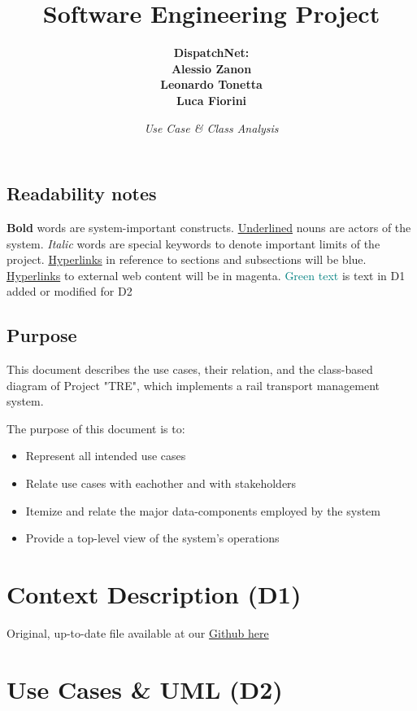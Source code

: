 \documentclass[12pt]{report}
\title{\bf{Software Engineering Project}}
\author{\bf{DispatchNet:} \\ Alessio Zanon \\ Leonardo Tonetta \\ Luca Fiorini}
\date{\it{Use Case \& Class Analysis}}
\renewcommand\bf[1]{\textbf{#1}}
\renewcommand\it[1]{\textit{#1}}
\newcommand\un[1]{\underline{#1}}
\newcommand\gitter[1]{
	\href{https://github.com/DispatchNet/TRE/blob/main/#1}{Github here}
}
\begin{document}
\maketitle

\newpage
\tableofcontents \label{Contents}

\section*{Readability notes}
\bf{Bold} words are system-important constructs. \newline
\un{Underlined} nouns are actors of the system. \newline
\it{Italic} words are special keywords to denote important limits of the project. \newline
\hyperref[Contents]{Hyperlinks} in reference to sections and subsections will be blue. \newline
\href{https:\\www.google.com}{Hyperlinks} to external web content will be in magenta. \newline
\textcolor{teal}{Green text} is text in D1 added or modified for D2

\newpage

\section*{Purpose}
This document describes the use cases, their relation, and the class-based diagram of Project "TRE", which implements a rail transport management system.

The purpose of this document is to: 
\begin{itemize}
	\item Represent all intended use cases
	\item Relate use cases with eachother and with stakeholders
	\item Itemize and relate the major data-components employed by the system
	\item Provide a top-level view of the system's operations
\end{itemize}

\newpage

\chapter{Context Description (D1)}
Original, up-to-date file available at our \gitter{D1_DispatchNet/D1_DispatchNet.pdf}


\chapter{Use Cases \& UML (D2)}

\end{document}

